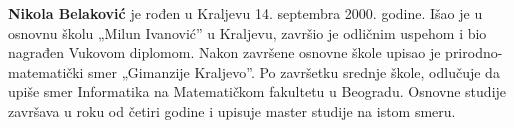 \documentclass[12pt,oneside]{memoir}
\begin{document}
\backmatter

\begin{biografija}
  \textbf{Nikola Belaković} je rođen u Kraljevu 14. septembra 2000. godine.
  Išao je u osnovnu školu „Milun Ivanović” u Kraljevu, završio je odličnim uspehom
  i bio nagrađen Vukovom diplomom. Nakon završene osnovne škole
  upisao je prirodno-matematički smer „Gimanzije Kraljevo”.
  Po završetku srednje škole, odlučuje da upiše smer Informatika na Matematičkom fakultetu u Beogradu.
  Osnovne studije završava u roku od četiri godine i upisuje master studije na istom smeru.
  

\end{biografija}
\end{document}

